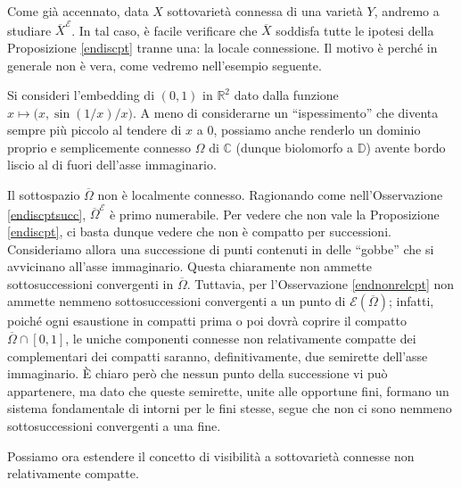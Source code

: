 \begin{oss} \label{servelocconn}
    Come già accennato, data $X$ sottovarietà connessa di una varietà $Y$, andremo a studiare $\overline{X}^\mathcal{E}$. In tal caso, è facile verificare che $\overline{X}$ soddisfa tutte le ipotesi della Proposizione \ref{endiscpt} tranne una: la locale connessione. Il motivo è perché in generale non è vera, come vedremo nell'esempio seguente.
\end{oss}

\begin{ex} \label{servelocconnex}
    Si consideri l'embedding di $(0,1)$ in $\mathbb{R}^2$ dato dalla funzione $x\longmapsto \big(x,\sin(1/x)/x\big)$. A meno di considerarne un ``ispessimento'' che diventa sempre più piccolo al tendere di $x$ a $0$, possiamo anche renderlo un dominio proprio e semplicemente connesso $\Omega$ di $\mathbb{C}$ (dunque biolomorfo a $\mathbb{D}$) avente bordo liscio al di fuori dell'asse immaginario.

    Il sottospazio $\overline{\Omega}$ non è localmente connesso. Ragionando come nell'Osservazione \ref{endiscptsucc}, $\overline{\Omega}^\mathcal{E}$ è primo numerabile. Per vedere che non vale la Proposizione \ref{endiscpt}, ci basta dunque vedere che non è compatto per successioni. Consideriamo allora una successione di punti contenuti in delle ``gobbe'' che si avvicinano all'asse immaginario. Questa chiaramente non ammette sottosuccessioni convergenti in $\overline{\Omega}$. Tuttavia, per l'Osservazione \ref{endnonrelcpt} non ammette nemmeno sottosuccessioni convergenti a un punto di $\mathcal{E}(\overline{\Omega})$; infatti, poiché ogni esaustione in compatti prima o poi dovrà coprire il compatto $\overline{\Omega}\cap[0,1]$, le uniche componenti connesse non relativamente compatte dei complementari dei compatti saranno, definitivamente, due semirette dell'asse immaginario. È chiaro però che nessun punto della successione vi può appartenere, ma dato che queste semirette, unite alle opportune fini, formano un sistema fondamentale di intorni per le fini stesse, segue che non ci sono nemmeno sottosuccessioni convergenti a una fine.
\end{ex}

Possiamo ora estendere il concetto di visibilità a sottovarietà connesse non relativamente compatte.


